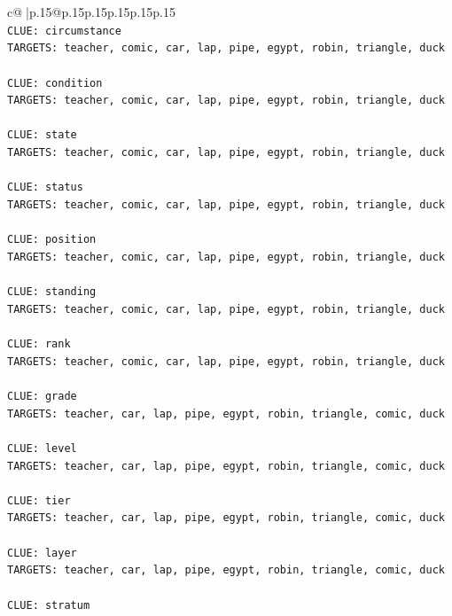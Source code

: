 \documentclass{article}
\begin{document}
{\begin{supertabular}{c@{$\;$}|p{.15\linewidth}@{}p{.15\linewidth}p{.15\linewidth}p{.15\linewidth}p{.15\linewidth}p{.15\linewidth}}
{{{\\ 
\texttt{CLUE: circumstance} \\
\texttt{TARGETS: teacher, comic, car, lap, pipe, egypt, robin, triangle, duck} \\
\\ 
\texttt{CLUE: condition} \\
\texttt{TARGETS: teacher, comic, car, lap, pipe, egypt, robin, triangle, duck} \\
\\ 
\texttt{CLUE: state} \\
\texttt{TARGETS: teacher, comic, car, lap, pipe, egypt, robin, triangle, duck} \\
\\ 
\texttt{CLUE: status} \\
\texttt{TARGETS: teacher, comic, car, lap, pipe, egypt, robin, triangle, duck} \\
\\ 
\texttt{CLUE: position} \\
\texttt{TARGETS: teacher, comic, car, lap, pipe, egypt, robin, triangle, duck} \\
\\ 
\texttt{CLUE: standing} \\
\texttt{TARGETS: teacher, comic, car, lap, pipe, egypt, robin, triangle, duck} \\
\\ 
\texttt{CLUE: rank} \\
\texttt{TARGETS: teacher, comic, car, lap, pipe, egypt, robin, triangle, duck} \\
\\ 
\texttt{CLUE: grade} \\
\texttt{TARGETS: teacher, car, lap, pipe, egypt, robin, triangle, comic, duck} \\
\\ 
\texttt{CLUE: level} \\
\texttt{TARGETS: teacher, car, lap, pipe, egypt, robin, triangle, comic, duck} \\
\\ 
\texttt{CLUE: tier} \\
\texttt{TARGETS: teacher, car, lap, pipe, egypt, robin, triangle, comic, duck} \\
\\ 
\texttt{CLUE: layer} \\
\texttt{TARGETS: teacher, car, lap, pipe, egypt, robin, triangle, comic, duck} \\
\\ 
\texttt{CLUE: stratum} \\
}}}
\end{supertabular}}
\end{document}
